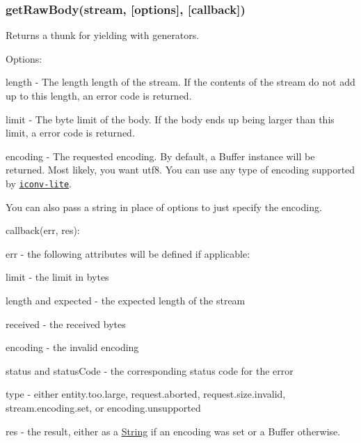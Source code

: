 \subsubsection*{get\+Raw\+Body(stream, \mbox{[}options\mbox{]}, \mbox{[}callback\mbox{]})}

Returns a thunk for yielding with generators.

Options\+:


\begin{DoxyItemize}
\item {\ttfamily length} -\/ The length length of the stream. If the contents of the stream do not add up to this length, an {} error code is returned.
\item {\ttfamily limit} -\/ The byte limit of the body. If the body ends up being larger than this limit, a {} error code is returned.
\item {\ttfamily encoding} -\/ The requested encoding. By default, a {\ttfamily Buffer} instance will be returned. Most likely, you want {\ttfamily utf8}. You can use any type of encoding supported by \href{https://www.npmjs.org/package/iconv-lite#readme}{\tt iconv-\/lite}.
\end{DoxyItemize}

You can also pass a string in place of options to just specify the encoding.

{\ttfamily callback(err, res)}\+:


\begin{DoxyItemize}
\item {\ttfamily err} -\/ the following attributes will be defined if applicable\+:
\begin{DoxyItemize}
\item {\ttfamily limit} -\/ the limit in bytes
\item {\ttfamily length} and {\ttfamily expected} -\/ the expected length of the stream
\item {\ttfamily received} -\/ the received bytes
\item {\ttfamily encoding} -\/ the invalid encoding
\item {\ttfamily status} and {\ttfamily status\+Code} -\/ the corresponding status code for the error
\item {\ttfamily type} -\/ either {\ttfamily entity.\+too.\+large}, {\ttfamily request.\+aborted}, {\ttfamily request.\+size.\+invalid}, {\ttfamily stream.\+encoding.\+set}, or {\ttfamily encoding.\+unsupported}
\end{DoxyItemize}
\item {\ttfamily res} -\/ the result, either as a {\ttfamily \hyperlink{class_string}{String}} if an encoding was set or a {\ttfamily Buffer} otherwise.
\end{DoxyItemize}


